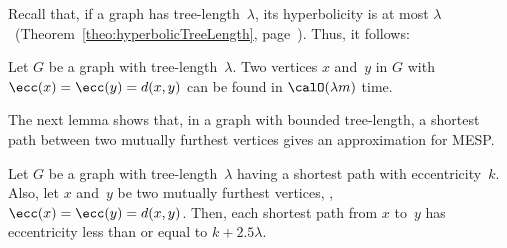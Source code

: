 Recall that, if a graph has tree-length~$\lambda$, its hyperbolicity is at most $\lambda$~(Theorem~\ref{theo:hyperbolicTreeLength}, page~\pageref{theo:hyperbolicTreeLength}).
Thus, it follows:

\begin{corollary}
    \label{cor:mutualDistTreeLen}
Let \( G \) be a graph with tree-length~\( \lambda \).
Two vertices \( x \) and~\( y \) in \( G \) with \( \ecc(x) = \ecc(y) = d(x, y) \) can be found in \( \calO(\lambda m) \) time.
\end{corollary}

The next lemma shows that, in a graph with bounded tree-length, a shortest path between two mutually furthest vertices gives an approximation for MESP.

\begin{lemma}
    \label{lem:ApproxTreeLen}
Let \( G \) be a graph with tree-length~\( \lambda \) having a shortest path with eccentricity~\( k \).
Also, let \( x \) and~\( y \) be two mutually furthest vertices, \ie, \( \ecc(x) = \ecc(y) = d(x, y) \).
Then, each shortest path from \( x \) to~\( y \) has eccentricity less than or equal to \( k + 2.5 \lambda \).
\end{lemma}

